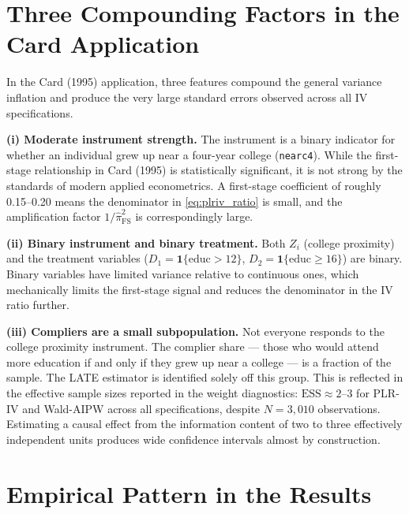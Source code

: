 \documentclass[12pt,a4paper]{article}
\begin{document}
\section{Three Compounding Factors in the Card Application}

In the Card (1995) application, three features compound the general variance inflation
and produce the very large standard errors observed across all IV specifications.

\medskip\noindent\textbf{(i) Moderate instrument strength.}
The instrument is a binary indicator for whether an individual grew up near a four-year
college (\texttt{nearc4}).  While the first-stage relationship in Card (1995) is
statistically significant, it is not strong by the standards of modern applied
econometrics.  A first-stage coefficient of roughly 0.15--0.20 means the denominator
in \eqref{eq:plriv_ratio} is small, and the amplification factor $1/\hat\pi_{\mathrm{FS}}^2$
is correspondingly large.

\medskip\noindent\textbf{(ii) Binary instrument and binary treatment.}
Both $Z_i$ (college proximity) and the treatment variables ($D_1 = \mathbf{1}\{\text{educ}>12\}$,
$D_2 = \mathbf{1}\{\text{educ}\geq 16\}$) are binary.  Binary variables have limited
variance relative to continuous ones, which mechanically limits the first-stage signal
and reduces the denominator in the IV ratio further.

\medskip\noindent\textbf{(iii) Compliers are a small subpopulation.}
Not everyone responds to the college proximity instrument.  The complier share ---
those who would attend more education if and only if they grew up near a college ---
is a fraction of the sample.  The LATE estimator is identified solely off this group.
This is reflected in the effective sample sizes reported in the weight diagnostics:
$\mathrm{ESS} \approx 2$--$3$ for PLR-IV and Wald-AIPW across all specifications,
despite $N = 3{,}010$ observations.  Estimating a causal effect from the information
content of two to three effectively independent units produces wide confidence intervals
almost by construction.

\section{Empirical Pattern in the Results}
\end{document}
